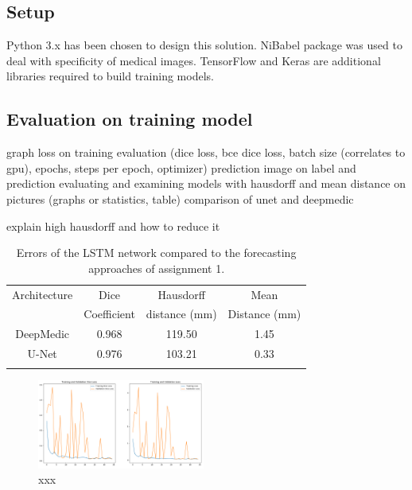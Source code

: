 
\subsection{Setup}

Python 3.x has been chosen to design this solution. NiBabel package was used to deal with specificity of medical images. TensorFlow and Keras are additional libraries required to build training models. 

\subsection{Evaluation on training model}
graph loss on training evaluation (dice loss, bce dice loss, batch size (correlates to gpu), epochs, steps per epoch, optimizer)
prediction
image on label and prediction 
evaluating and examining models with hausdorff and mean distance on pictures (graphs or statistics, table)
comparison of unet and deepmedic

explain high hausdorff and how to reduce it

\begin{table}[h!]
	\centering
	\setlength{\tabcolsep}{10pt}
	\renewcommand{\arraystretch}{1.5}
	\begin{tabular}{c c c c}
		\hline 
		Architecture & Dice & Hausdorff & Mean \\
		& Coefficient & distance (mm) & Distance (mm) \\ 
		\hline 
		DeepMedic & 0.968 & 119.50 & 1.45 \\ 
		U-Net & 0.976 & 103.21 & 0.33 \\ 
		\hline
		\newline 
	\end{tabular}
	\caption{Errors of the LSTM network compared to the forecasting approaches of assignment 1.}
	\label{table_result}
\end{table}


\begin{figure}[h!]
	\includegraphics[width=0.49\textwidth, angle=0]{files/jpgunettrain.png}
	\caption{xxx}
	\label{scan_picture}
\end{figure}

